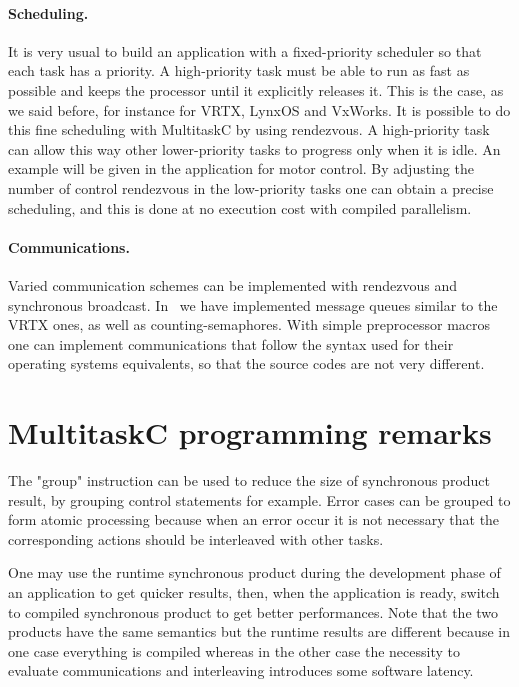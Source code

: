 \documentclass[10pt]{report}
\begin{document}
\paragraph{Scheduling.} It is very usual to build an application with a fixed-priority scheduler
so that each task has a priority. A high-priority task must be able to run as fast as possible and keeps 
the processor until it explicitly releases it. This is the case, as we said before, for instance for VRTX, 
LynxOS and VxWorks. It is possible to do this fine scheduling with MultitaskC by using rendezvous. 
A high-priority task can allow this way other lower-priority tasks to progress only when it is idle. An
example will be given in the application for motor control. By adjusting the number of control rendezvous in 
the low-priority tasks one can obtain a precise scheduling, and this is done at no execution cost with 
compiled parallelism.

\paragraph{Communications.} Varied communication schemes can be implemented with rendezvous and synchronous broadcast. 
In~\cite{Delchini:95} we have implemented message queues similar to the VRTX ones, as well as counting-semaphores. 
With simple preprocessor macros one can implement communications that follow the syntax used for their operating systems 
equivalents, so that the source codes are not very different.

\section{MultitaskC programming remarks}

The "group" instruction can be used to reduce the size of synchronous product result, by grouping control
statements for example. Error cases can be grouped to form atomic processing because when an error
occur it is not necessary that the corresponding actions should be interleaved with other tasks.

One may use the runtime synchronous product during the development phase of an application to get quicker results, 
then, when the application is ready, switch to compiled synchronous product to get better performances. 
Note that the two products have the same semantics but the runtime results are different because in one case everything 
is compiled whereas in the other case the necessity to evaluate communications and interleaving introduces some software latency.
\end{document}
